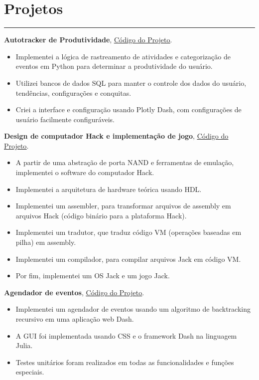 \documentclass[a4paper,10pt]{article}
\newcommand{\ulink}[2]{\href{#1}{\underline{#2}}}
\begin{document}
\section*{Projetos}
\hrule
\vspace{2mm}
\textbf{Autotracker de Produtividade}, \ulink{https://github.com/rokobo/Productivity-autotracker}{Código do Projeto}.
\begin{itemize}[itemsep=0pt]
  \item Implementei a lógica de rastreamento de atividades e categorização de eventos em Python para determinar a produtividade do usuário.
  \item Utilizei bancos de dados SQL para manter o controle dos dados do usuário, tendências, configurações e conquitas.
  \item Criei a interface e configuração usando Plotly Dash, com configurações de usuário facilmente configuráveis.
\end{itemize}
\textbf{Design de computador Hack e implementação de jogo}, \ulink{https://github.com/rokobo/From-Nand-gates-to-Tetris-implementation}{Código do Projeto}.
\begin{itemize}[itemsep=0pt]
  \item A partir de uma abstração de porta NAND e ferramentas de emulação, implementei o software do computador Hack.
  \item Implementei a arquitetura de hardware teórica usando HDL.
  \item Implementei um assembler, para transformar arquivos de assembly em arquivos Hack (código binário para a plataforma Hack).
  \item Implementei um tradutor, que traduz código VM (operações baseadas em pilha) em assembly.
  \item Implementei um compilador, para compilar arquivos Jack em código VM.
  \item Por fim, implementei um OS Jack e um jogo Jack.
\end{itemize}
\textbf{Agendador de eventos}, \ulink{https://github.com/rokobo/Event-Scheduler}{Código do Projeto}.
\begin{itemize}[itemsep=0pt]
  \item Implementei um agendador de eventos usando um algoritmo de backtracking recursivo em uma aplicação web Dash.
  \item A GUI foi implementada usando CSS e o framework Dash na linguagem Julia.
  \item Testes unitários foram realizados em todas as funcionalidades e funções especiais.
\end{itemize}
\end{document}
